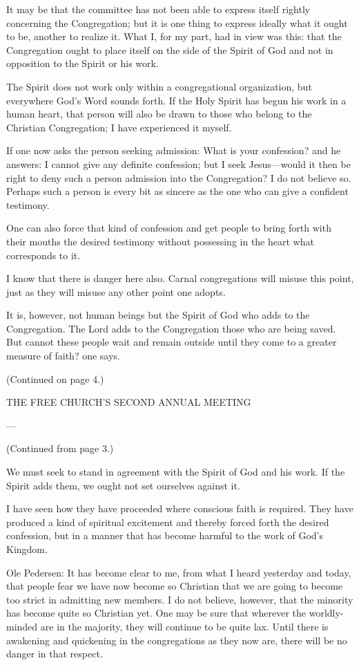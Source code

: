 It may be that the committee has not been able to express itself rightly concerning the Congregation; but it is one thing to express ideally what it ought to be, another to realize it. What I, for my part, had in view was this: that the Congregation ought to place itself on the side of the Spirit of God and not in opposition to the Spirit or his work.

The Spirit does not work only within a congregational organization, but everywhere God’s Word sounds forth. If the Holy Spirit has begun his work in a human heart, that person will also be drawn to those who belong to the Christian Congregation; I have experienced it myself.

If one now asks the person seeking admission: What is your confession? and he answers: I cannot give any definite confession; but I seek Jesus—would it then be right to deny such a person admission into the Congregation? I do not believe so. Perhaps such a person is every bit as sincere as the one who can give a confident testimony.

One can also force that kind of confession and get people to bring forth with their mouths the desired testimony without possessing in the heart what corresponds to it.

I know that there is danger here also. Carnal congregations will misuse this point, just as they will misuse any other point one adopts.

It is, however, not human beings but the Spirit of God who adds to the Congregation. The Lord adds to the Congregation those who are being saved. But cannot these people wait and remain outside until they come to a greater measure of faith? one says.

(Continued on page 4.)

THE FREE CHURCH’S SECOND ANNUAL MEETING

—

(Continued from page 3.)

We must seek to stand in agreement with the Spirit of God and his work. If the Spirit adds them, we ought not set ourselves against it.

I have seen how they have proceeded where conscious faith is required. They have produced a kind of spiritual excitement and thereby forced forth the desired confession, but in a manner that has become harmful to the work of God’s Kingdom.

Ole Pedersen: It has become clear to me, from what I heard yesterday and today, that people fear we have now become so Christian that we are going to become too strict in admitting new members. I do not believe, however, that the minority has become quite so Christian yet. One may be sure that wherever the worldly-minded are in the majority, they will continue to be quite lax. Until there is awakening and quickening in the congregations as they now are, there will be no danger in that respect.

